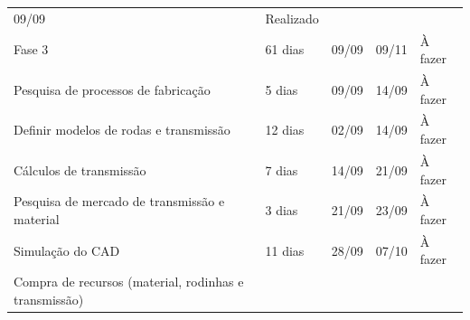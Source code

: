 \begin{table}[H]
{\begin{tabular}{ l l l l l }
    \multicolumn{1}{p{0.967cm}|}{09/09 \centering } &
    \multicolumn{1}{p{1.833cm}|}{Realizado \centering }
  \\  
  \cline{1-1}\cline{2-2}\cline{3-3}\cline{4-4}\cline{5-5}  
    \multicolumn{1}{|p{3.867cm}|}{Fase 3} &
    \multicolumn{1}{p{1.700cm}|}{61 dias \centering } &
    \multicolumn{1}{p{1.133cm}|}{09/09 \centering } &
    \multicolumn{1}{p{0.967cm}|}{09/11 \centering } &
    \multicolumn{1}{p{1.833cm}|}{À fazer \centering }
  \\  
  \cline{1-1}\cline{2-2}\cline{3-3}\cline{4-4}\cline{5-5}  
    \multicolumn{1}{|p{3.867cm}|}{Pesquisa de processos de fabricação} &
    \multicolumn{1}{p{1.700cm}|}{5 dias \centering } &
    \multicolumn{1}{p{1.133cm}|}{09/09 \centering } &
    \multicolumn{1}{p{0.967cm}|}{14/09 \centering } &
    \multicolumn{1}{p{1.833cm}|}{À fazer \centering }
  \\  
  \cline{1-1}\cline{2-2}\cline{3-3}\cline{4-4}\cline{5-5}  
    \multicolumn{1}{|p{3.867cm}|}{Definir modelos de rodas e transmissão} &
    \multicolumn{1}{p{1.700cm}|}{12 dias \centering } &
    \multicolumn{1}{p{1.133cm}|}{02/09 \centering } &
    \multicolumn{1}{p{0.967cm}|}{14/09 \centering } &
    \multicolumn{1}{p{1.833cm}|}{À fazer \centering }
  \\  
  \cline{1-1}\cline{2-2}\cline{3-3}\cline{4-4}\cline{5-5}  
    \multicolumn{1}{|p{3.867cm}|}{Cálculos de transmissão} &
    \multicolumn{1}{p{1.700cm}|}{7 dias \centering } &
    \multicolumn{1}{p{1.133cm}|}{14/09 \centering } &
    \multicolumn{1}{p{0.967cm}|}{21/09 \centering } &
    \multicolumn{1}{p{1.833cm}|}{À fazer \centering }
  \\  
  \cline{1-1}\cline{2-2}\cline{3-3}\cline{4-4}\cline{5-5}  
    \multicolumn{1}{|p{3.867cm}|}{Pesquisa de mercado de transmissão e material} &
    \multicolumn{1}{p{1.700cm}|}{3 dias \centering } &
    \multicolumn{1}{p{1.133cm}|}{21/09 \centering } &
    \multicolumn{1}{p{0.967cm}|}{23/09 \centering } &
    \multicolumn{1}{p{1.833cm}|}{À fazer \centering }
  \\  
  \cline{1-1}\cline{2-2}\cline{3-3}\cline{4-4}\cline{5-5}  
    \multicolumn{1}{|p{3.867cm}|}{Simulação do CAD} &
    \multicolumn{1}{p{1.700cm}|}{11 dias \centering } &
    \multicolumn{1}{p{1.133cm}|}{28/09 \centering } &
    \multicolumn{1}{p{0.967cm}|}{07/10 \centering } &
    \multicolumn{1}{p{1.833cm}|}{À fazer \centering }
  \\  
  \cline{1-1}\cline{2-2}\cline{3-3}\cline{4-4}\cline{5-5}  
    \multicolumn{1}{|p{3.867cm}|}{Compra de recursos (material, rodinhas e transmissão)} &

\end{tabular}}
\end{table}
